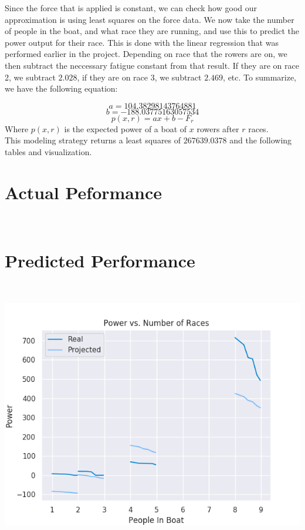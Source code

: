\documentclass[12pt]{article} %
\begin{document}
Since the force that is applied is constant, we can check how good our approximation is using least squares on the force data. We now take the number of people in the boat, and what race they are running, and use this to predict the power output for their race. This is done with the linear regression that was performed earlier in the project. Depending on race that the rowers are on, we then subtract the neccessary fatigue constant from that result. If they are on race 2, we subtract $2.028$, if they are on race 3, we subtract $2.469$, etc. To summarize, we have the following equation:

    \[a = 104.38298143764881\]
    \[b = -188.03775163057534\]
    \[p(x,r)=ax+b -F_{r} \]
  Where $p(x,r)$ is the expected power of a boat of $x$ rowers after $r$ races.
\\This modeling strategy returns a least squares of $267639.0378$ and the following tables and visualization.





\section*{Actual Peformance}

{\centering
{}
\\}

\section*{Predicted Performance}

{\centering
{}
\\}


\includegraphics{modeling_results.png}
\end{document}
